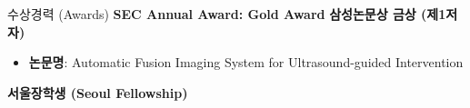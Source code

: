 \begin{rubric}{수상경력 (Awards)}
    \entry*[2015] \textbf{SEC Annual Award: Gold Award}
    \entry*[2014] \textbf{삼성논문상 금상 (제1저자)}
        \begin{itemize}[leftmargin=1em, itemsep=0em, labelsep=0.5em,topsep=0.5em]
            \item \textbf{논문명}: Automatic Fusion Imaging System for Ultrasound-guided Intervention
        \end{itemize}
        \vspace{1em}
    \entry*[2009] \textbf{서울장학생 (Seoul Fellowship)}
\end{rubric}